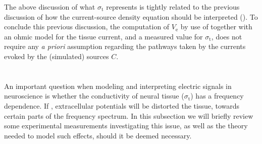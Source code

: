 The above discussion of what $\sigma_\text{t}$ represents is tightly related to the previous discussion
of how the current-source density equation should be interpreted ().
To conclude this previous discussion, the computation of $V_\text{e}$ by use of  together with 
an ohmic model for the tissue current, and a measured value for $\sigma_\text{t}$, 
does not require any \textit{a priori} assumption regarding the pathways 
taken by the currents evoked by the (simulated) sources $C$.


\section{}
\label{sec:Sigma:f-independent}
An important question when modeling and interpreting electric signals in neuroscience 
is whether the conductivity of neural tissue ($\sigma_\text{t}$) has a frequency dependence. 
If , 
extracellular potentials will be distorted  the tissue, 
 towards certain parts of the frequency spectrum. 
In this subsection we will briefly review some experimental measurements investigating this issue, 
as well as the theory needed to model such effects, should it be deemed necessary.

